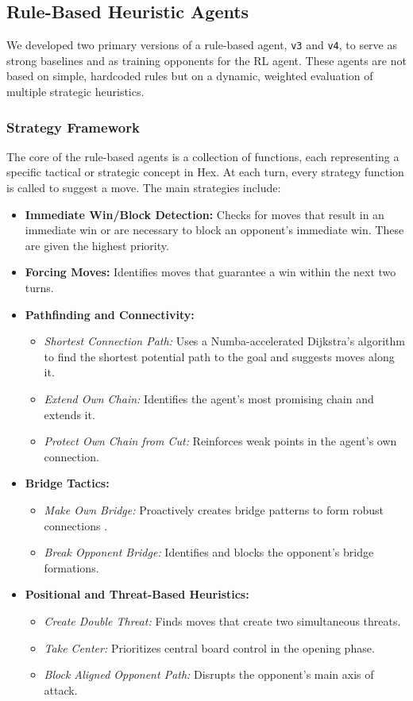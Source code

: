 \documentclass[conference]{IEEEtran}
\begin{document}
\subsection{Rule-Based Heuristic Agents}
We developed two primary versions of a rule-based agent, \texttt{v3} and \texttt{v4}, to serve as strong baselines and as training opponents for the RL agent. These agents are not based on simple, hardcoded rules but on a dynamic, weighted evaluation of multiple strategic heuristics.

\subsubsection{Strategy Framework}
The core of the rule-based agents is a collection of functions, each representing a specific tactical or strategic concept in Hex. At each turn, every strategy function is called to suggest a move. The main strategies include:
\begin{itemize}
    \item \textbf{Immediate Win/Block Detection:} Checks for moves that result in an immediate win or are necessary to block an opponent's immediate win. These are given the highest priority.
    \item \textbf{Forcing Moves:} Identifies moves that guarantee a win within the next two turns.
    \item \textbf{Pathfinding and Connectivity:}
          \begin{itemize}
              \item \textit{Shortest Connection Path:} Uses a Numba-accelerated Dijkstra's algorithm to find the shortest potential path to the goal and suggests moves along it.
              \item \textit{Extend Own Chain:} Identifies the agent's most promising chain and extends it.
              \item \textit{Protect Own Chain from Cut:} Reinforces weak points in the agent's own connection.
          \end{itemize}
    \item \textbf{Bridge Tactics:}
          \begin{itemize}
              \item \textit{Make Own Bridge:} Proactively creates bridge patterns to form robust connections \cite{b5}.
              \item \textit{Break Opponent Bridge:} Identifies and blocks the opponent's bridge formations.
          \end{itemize}
    \item \textbf{Positional and Threat-Based Heuristics:}
          \begin{itemize}
              \item \textit{Create Double Threat:} Finds moves that create two simultaneous threats.
              \item \textit{Take Center:} Prioritizes central board control in the opening phase.
              \item \textit{Block Aligned Opponent Path:} Disrupts the opponent's main axis of attack.
          \end{itemize}
\end{itemize}
\end{document}
